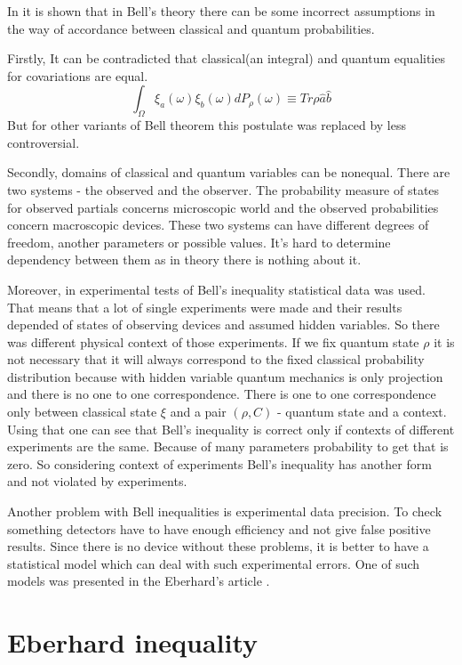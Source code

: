 \documentclass[11pt]{article}
\begin{document}
In \cite{Khrennikov_information} it is shown that in Bell's theory there can be some incorrect assumptions in the way of accordance between classical and quantum probabilities.

Firstly, It can be contradicted that classical(an integral) and quantum equalities for covariations are equal.
$$\int_\Omega\xi_a(\omega)\xi_b(\omega)dP_\rho(\omega) \equiv Tr\rho\hat{a}\hat{b}$$
But for other variants of Bell theorem this postulate was replaced by less controversial.

Secondly, domains of classical and quantum variables can be nonequal. There are two systems - the observed and the observer. The probability measure of states for observed partials concerns microscopic world and the observed probabilities concern macroscopic devices. These two systems can have different degrees of freedom, another parameters or possible values. It's hard to determine dependency between them as in theory there is nothing about it.

Moreover, in experimental tests of Bell's inequality statistical data was used. That means that a lot of single experiments were made and their results depended of states of observing devices and assumed hidden variables. So there was different physical context of those experiments. If we fix quantum state $\rho$ it is not necessary that it will always correspond to the fixed classical probability distribution because with hidden variable quantum mechanics is only projection and there is no one to one correspondence. There is one to one correspondence only between classical state $\xi$ and a pair $(\rho, C)$ - quantum state and a context. Using that one can see that Bell's inequality is correct only if contexts of different experiments are the same. Because of many parameters probability to get that is zero. So considering context of experiments Bell's inequality has another form and not violated by experiments.

Another problem with Bell inequalities is experimental data precision. To check something detectors have to have enough efficiency and not give false positive results. Since there is no device without these problems, it is better to have a statistical model which can deal with such experimental errors. One of such models was presented in the Eberhard's article \cite{Eberhard}.

\section{Eberhard inequality}
\end{document}

